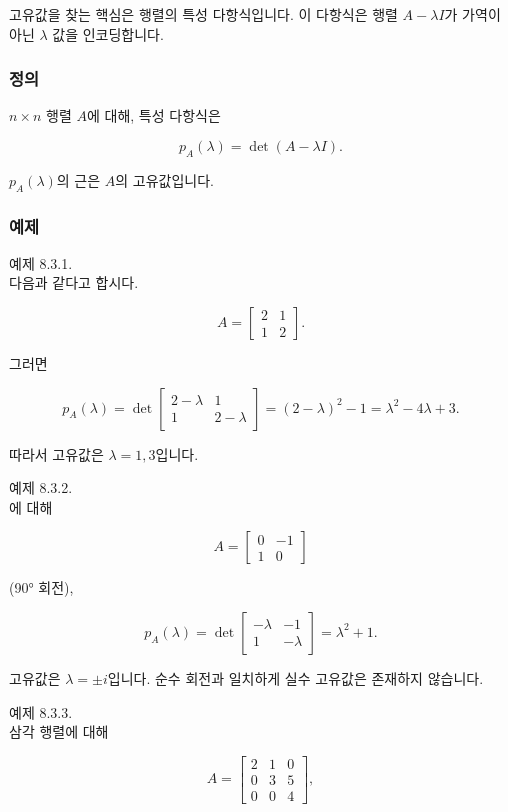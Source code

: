\documentclass[
  12pt,
  a4paper,
]{article}
\begin{document}
고유값을 찾는 핵심은 행렬의 특성 다항식입니다. 이 다항식은 행렬 \(A - \lambda I\)가 가역이 아닌 \(\lambda\) 값을 인코딩합니다.

\subsubsection{정의}\label{definition-7}

\(n \times n\) 행렬 \(A\)에 대해, 특성 다항식은

\[p_A(\lambda) = \det(A - \lambda I).\]

\(p_A(\lambda)\)의 근은 \(A\)의 고유값입니다.

\subsubsection{예제}\label{examples-8}

예제 8.3.1.\\
다음과 같다고 합시다.

\[A = \begin{bmatrix} 2 & 1 \\ 1 & 2 \end{bmatrix}.\]

그러면

\[p_A(\lambda) = \det\!\begin{bmatrix} 2-\lambda & 1 \\ 1 & 2-\lambda \end{bmatrix}
= (2-\lambda)^2 - 1 = \lambda^2 - 4\lambda + 3.\]

따라서 고유값은 \(\lambda = 1, 3\)입니다.

예제 8.3.2.\\
에 대해

\[A = \begin{bmatrix} 0 & -1 \\ 1 & 0 \end{bmatrix}\]

(90° 회전),

\[p_A(\lambda) = \det\!\begin{bmatrix} -\lambda & -1 \\ 1 & -\lambda \end{bmatrix}
= \lambda^2 + 1.\]

고유값은 \(\lambda = \pm i\)입니다. 순수 회전과 일치하게 실수 고유값은 존재하지 않습니다.

예제 8.3.3.\\
삼각 행렬에 대해

\[A = \begin{bmatrix} 2 & 1 & 0 \\ 0 & 3 & 5 \\ 0 & 0 & 4 \end{bmatrix},\]
\end{document}
